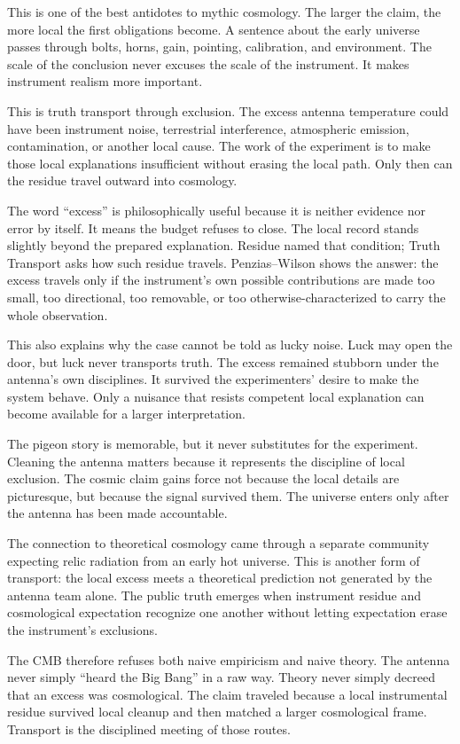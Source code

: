 This is one of the best antidotes to mythic cosmology. The larger the
claim, the more local the first obligations become. A sentence about the
early universe passes through bolts, horns, gain, pointing, calibration,
and environment. The scale of the conclusion never excuses the scale of
the instrument. It makes instrument realism more important.

This is truth transport through exclusion. The excess antenna temperature
could have been instrument noise, terrestrial interference, atmospheric
emission, contamination, or another local cause. The work of the
experiment is to make those local explanations insufficient without erasing
the local path. Only then can the residue travel outward into cosmology.

The word ``excess'' is philosophically useful because it is neither
evidence nor error by itself. It means the budget refuses to close. The
local record stands slightly beyond the prepared explanation. Residue
named that condition; Truth Transport asks how such residue travels.
Penzias--Wilson shows the answer: the excess travels only if the
instrument's own possible contributions are made too small, too
directional, too removable, or too otherwise-characterized to carry the
whole observation.

This also explains why the case cannot be told as lucky noise. Luck may
open the door, but luck never transports truth. The excess remained
stubborn under the antenna's own disciplines. It survived the
experimenters' desire to make the system behave. Only a nuisance that
resists competent local explanation can become available for a larger
interpretation.

The pigeon story is memorable, but it never substitutes for the
experiment. Cleaning the antenna matters because it represents the
discipline of local exclusion. The cosmic claim gains force not because
the local details are picturesque, but because the signal survived them.
The universe enters only after the antenna has been made accountable.

The connection to theoretical cosmology came through a separate community
expecting relic radiation from an early hot universe. This is another form
of transport: the local excess meets a theoretical prediction not
generated by the antenna team alone. The public truth emerges when
instrument residue and cosmological expectation recognize one another
without letting expectation erase the instrument's exclusions.

The CMB therefore refuses both naive empiricism and naive theory. The
antenna never simply ``heard the Big Bang'' in a raw way. Theory never
simply decreed that an excess was cosmological. The claim traveled because
a local instrumental residue survived local cleanup and then matched a
larger cosmological frame. Transport is the disciplined meeting of those
routes.

